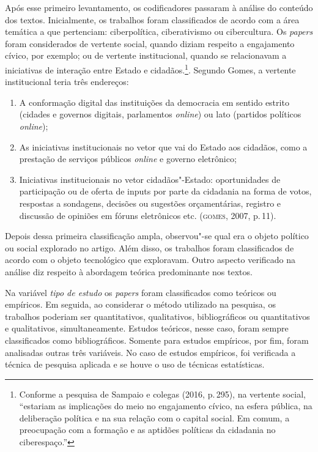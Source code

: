 {Após esse primeiro levantamento, os codificadores passaram à análise do
conteúdo dos textos. Inicialmente, os trabalhos foram classificados de
acordo com a área temática a que pertenciam: ciberpolítica,
ciberativismo ou cibercultura. Os \textit{papers} foram considerados 
de vertente social, quando diziam respeito a engajamento cívico, por
exemplo; ou de vertente institucional, quando se relacionavam a
iniciativas de interação entre Estado e cidadãos.\footnote{Conforme a
  pesquisa de Sampaio e colegas (2016, p.\,295), na vertente social,
  ``estariam as implicações do meio no engajamento cívico, na esfera
  pública, na deliberação política e na sua relação com o capital
  social. Em comum, a preocupação com a formação e as aptidões políticas
  da cidadania no ciberespaço.''}. Segundo Gomes, a vertente
  institucional teria três endereços: 

\begin{enumerate}
\item  A conformação digital das instituições da democracia em sentido estrito (cidades e governos digitais, parlamentos \textit{online}) ou lato (partidos políticos \textit{online});

\item As iniciativas institucionais no vetor que vai do Estado aos cidadãos, como a prestação de serviços públicos \textit{online} e governo eletrônico;

\item Iniciativas institucionais no vetor cidadãos"-Estado: oportunidades de participação ou de oferta de inputs por parte da cidadania na forma de votos, respostas a sondagens, decisões ou sugestões orçamentárias, registro e discussão de opiniões em fóruns eletrônicos etc. (\textsc{gomes}, 2007, p.\,11).
\end{enumerate}

Depois dessa primeira classificação ampla, observou"-se qual era o objeto
político ou social explorado no artigo. Além disso, os trabalhos foram
classificados de acordo com o objeto tecnológico que exploravam. Outro
aspecto verificado na análise diz respeito à abordagem teórica
predominante nos textos.

Na variável \textit{tipo de estudo} os \textit{papers} foram classificados como
teóricos ou empíricos. Em seguida, ao considerar o método utilizado na
pesquisa, os trabalhos poderiam ser quantitativos, qualitativos,
bibliográficos ou quantitativos e qualitativos, simultaneamente. Estudos
teóricos, nesse caso, foram sempre classificados como bibliográficos.
Somente para estudos empíricos, por fim, foram analisadas outras três
variáveis. No caso de estudos empíricos, foi verificada a técnica de
pesquisa aplicada e se houve o uso de técnicas estatísticas.

}
